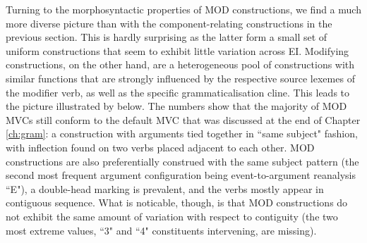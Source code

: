 
Turning to the morphosyntactic properties of MOD constructions, we find a much more diverse picture than with the component-relating constructions in the previous section. This is hardly surprising as the latter form a small set of uniform constructions that seem to exhibit little variation across EI. Modifying constructions, on the other hand, are a heterogeneous pool of constructions with similar functions that are strongly influenced by the respective source lexemes of the modifier verb, as well as the specific grammaticalisation cline. This leads to the picture illustrated by  below. The numbers show that the majority of MOD MVCs still conform to the default \textsc{MVC} that was discussed at the end of Chapter \ref{ch:gram}: a construction with arguments tied together in ``same subject" fashion, with inflection found on two verbs placed adjacent to each other. MOD constructions are also preferentially construed with the same subject pattern (the second most frequent argument configuration being event-to-argument reanalysis ``E"), a double-head marking is prevalent, and the verbs mostly appear in contiguous sequence. What is noticable, though, is that MOD constructions do not exhibit the same amount of variation with respect to contiguity (the two most extreme values, ``3" and ``4" constituents intervening, are missing).

